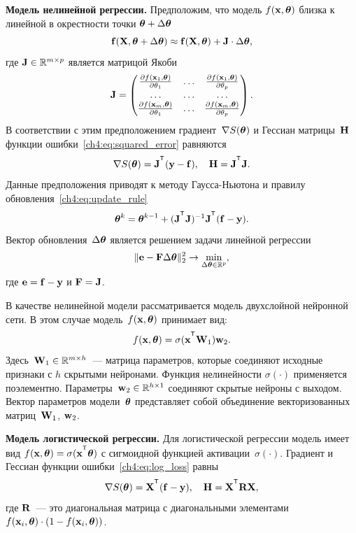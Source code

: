 \textbf{Модель нелинейной регрессии.}
Предположим, что модель $f (\mathbf{x} , \boldsymbol{\theta})$ близка к линейной в окрестности точки $\boldsymbol{\theta} + \Delta \boldsymbol{\theta}$
\[
	\mathbf{f}(\mathbf{X} , \boldsymbol{\theta} + \Delta \boldsymbol{\theta}) \approx \mathbf{f}(\mathbf{X} , \boldsymbol{\theta}) + \mathbf{J} \cdot \Delta  \boldsymbol{\theta},
\]
где $\mathbf{J} \in \mathbb{R}^{m \times p}$ является матрицой Якоби
\begin{equation*}
	\mathbf{J} = 
	\begin{pmatrix}
		\frac{\partial f(\mathbf{x}_1 , \boldsymbol{\theta})}{\partial \theta_1} & \dots & 
		\frac{\partial f(\mathbf{x}_1 , \boldsymbol{\theta})}{\partial \theta_p} \\
		\dots & \dots & \dots \\
		\frac{\partial f(\mathbf{x}_m , \boldsymbol{\theta})}{\partial \theta_1} & \dots & 
		\frac{\partial f(\mathbf{x}_m , \boldsymbol{\theta})}{\partial \theta_p}
	\end{pmatrix}.
\end{equation*}
В соответствии с этим предположением градиент~$\nabla S(\boldsymbol{\theta})$ и Гессиан матрицы~$\mathbf{H}$ функции ошибки~\eqref{ch4:eq:squared_error} равняются
\begin{equation}
	\nabla S(\btheta) = \bJ^{\T} (\by - \mathbf{f}), \quad \bH = \bJ^{\T} \bJ.
	\label{ch4:eq:nonlin_reg_deriv}
\end{equation}
Данные предположения приводят к методу Гаусса-Ньютона и правилу обновления~\eqref{ch4:eq:update_rule}
\[
	\btheta^k = \btheta^{k - 1} + (\bJ^{\T} \bJ)^{-1}\bJ^{\T}(\mathbf{f} - \by).
\]
Вектор обновления~$\Delta \boldsymbol{\theta}$ является решением задачи линейной регрессии
\begin{equation}
	\| \mathbf{e} - \mathbf{F} \Delta \boldsymbol{\theta} \|_2^2 \rightarrow \min_{\Delta \boldsymbol{\theta} \in \mathbb{R}^{p}},
	\label{ch4:eq:lin_reg_nonlin_reg}
\end{equation}
где $\mathbf{e} = \mathbf{f} - \mathbf{y}$ и $\mathbf{F} = \mathbf{J}$.

В качестве нелинейной модели рассматривается модель двухслойной нейронной сети. В этом случае модель~$f (\mathbf{x}, \boldsymbol{\theta})$ принимает вид:
\[
	f(\bx, \btheta) = \sigma(\bx^{\T} \bW_1) \bw_2.
\]
Здесь~$\mathbf{W}_1 \in \mathbb{R}^{m \times h}$~--- матрица параметров, которые соединяют исходные признаки с $h$ скрытыми нейронами. Функция нелинейности $\sigma(\cdot)$ применяется поэлементно. Параметры~$\mathbf{w}_2 \in \mathbb{R}^{h \times 1}$ соединяют скрытые нейроны с выходом. 
Вектор параметров модели~$\boldsymbol{\theta}$ представляет собой объединение векторизованных матриц~$\mathbf{W}_1$, $\mathbf{w}_2$.

\textbf{Модель логистической регрессии.}
Для логистической регрессии модель имеет вид $f(\bx , \btheta) = \sigma(\bx^{\T} \btheta)$ с сигмоидной функцией активации~$\sigma(\cdot)$.
Градиент и Гессиан функции ошибки~\eqref{ch4:eq:log_loss} равны
\begin{equation}
	\nabla S(\btheta) = \bX^{\T} (\mathbf{f} - \by), \quad \bH = \bX^{\T} \bR \bX,
	\label{ch4:eq:log_reg_deriv}
\end{equation}
где $\mathbf{R}$~--- это диагональная матрица с диагональными элементами $f(\mathbf{x}_i , \boldsymbol{\theta}) \cdot (1 - f(\mathbf{x}_i , \boldsymbol{\theta}))$.

